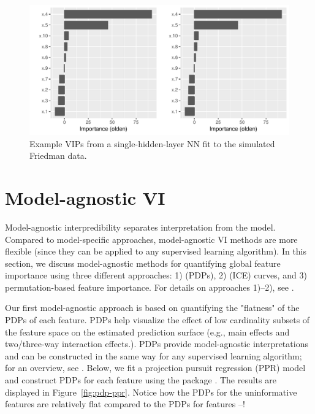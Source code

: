 \begin{figure}[!htb]
  \centering 
  \includegraphics[width=1\linewidth]{figures/vip-model-nn} 
  \caption{Example VIPs from a single-hidden-layer NN fit to the simulated Friedman data.}
  \label{fig:vip-earth}
\end{figure}


\section{Model-agnostic VI}

Model-agnostic interpredibility separates interpretation from the model. Compared to model-specific approaches, model-agnostic VI methods are more flexible (since they can be applied to any supervised learning algorithm). In this section, we discuss model-agnostic methods for quantifying global feature importance using three different approaches: 1)  (PDPs), 2)  (ICE) curves, and 3) permutation-based feature importance. For details on approaches 1)--2), see \citet{greenwell-simple-2018}.

Our first model-agnostic approach is based on quantifying the "flatness" of the PDPs of each feature. PDPs help visualize the effect of low cardinality subsets of the feature space on the estimated prediction surface (e.g., main effects and two/three-way interaction effects.). PDPs provide model-agnostic interpretations and can be constructed in the same way for any supervised learning algorithm; for an overview, see \citet{greenwell-pdp-2017}. Below, we fit a projection pursuit regression (PPR) model and construct PDPs for each feature using the  package \citet{greenwell-pdp-2017}. The results are displayed in Figure~\ref{fig:pdp-ppr}. Notice how the PDPs for the uninformative features are relatively flat compared to the PDPs for features --!

